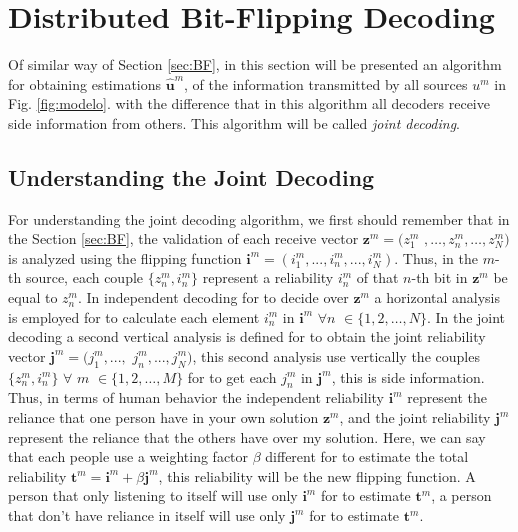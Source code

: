 \documentclass[journal]{IEEEtran}
\begin{document}
\section{Distributed Bit-Flipping Decoding} \label{sec:DBFD}

Of similar way of Section \ref{sec:BF}, in this section will be presented an algorithm for
obtaining estimations $\mathbf{\hat{u}}^{m}$, of the 
information transmitted by all sources $u^{m}$ in Fig. \ref{fig:modelo}.  with the difference
that in this algorithm all decoders receive side information from 
others. This algorithm will be called \textit{joint decoding}.

\subsection{Understanding the Joint Decoding}
\label{Subsec:Understanding}

For understanding the joint decoding algorithm, we first should remember that in the 
Section \ref{sec:BF}, the validation of each receive vector $\mathbf{z}^{m}=( z_{1}^{m}$ 
$, \dots, z_{n}^{m} , \dots,z_{N}^{m})$ is analyzed using the flipping function 
$\mathbf{i}^m=({i}^{m}_1, ..., {i}^{m}_n, ..., {i}^{m}_N)$. Thus, in the $m$-th 
source, each couple $\{z_{n}^{m},i_{n}^{m}\}$ represent a reliability ${i}^{m}_n$ 
of that $n$-th bit in $\mathbf{z}^{m}$ be equal to ${z}^{m}_n$. In independent 
decoding for to decide over $\mathbf{z}^{m}$ a horizontal analysis is employed 
for to calculate each element ${i}^{m}_n$ in $\mathbf{i}^m$ $\forall n$ 
$\in \{1, 2, \ldots, N\}$. In the joint decoding a second vertical analysis 
is defined for to obtain the joint reliability vector $\mathbf{j}^m=({j}^{m}_1, ...,$ 
${j}^{m}_n, ..., {j}^{m}_N)$, this second analysis use vertically the couples 
$\{z_{n}^{m},i_{n}^{m}\}$ $\forall$ $m$ $\in \{1, 2, \ldots, M\}$ for to get  
each ${j}^{m}_n$ in $\mathbf{j}^m$, this is side information. 
Thus, in terms of human behavior the independent reliability $\mathbf{i}^m$ 
represent the reliance that one person have in your own solution $\mathbf{z}^m$, and the 
joint reliability $\mathbf{j}^m$ represent the reliance that the others have over 
my solution. Here, we can say that each people use a weighting factor $\beta$
different for to estimate the total reliability 
$\mathbf{t}^m= \mathbf{i}^m + \beta \mathbf{j}^m $, this reliability will be 
the new flipping function. A person that only listening to itself will use only $\mathbf{i}^m$ for to estimate $\mathbf{t}^m$, a person that
don't have reliance in itself will use only $\mathbf{j}^m$ for to estimate $\mathbf{t}^m$.
\end{document}
